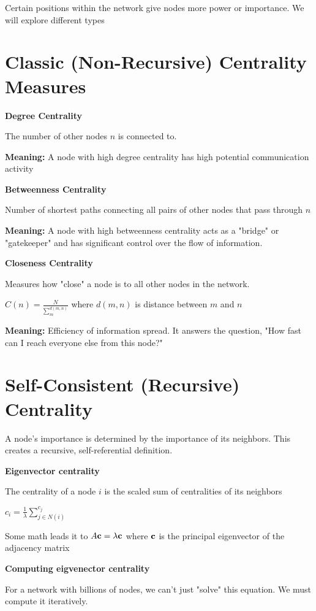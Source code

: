 Certain positions within the network give nodes more power or importance.
We will explore different types

\section*{Classic (Non-Recursive) Centrality Measures}

\textbf{Degree Centrality}

The number of other nodes $n$ is connected to. 

\textbf{Meaning:} A node with high degree centrality 
has high potential communication activity

\textbf{Betweenness Centrality}

Number of shortest paths connecting all pairs of other nodes that pass through $n$

\textbf{Meaning:} A node with high betweenness centrality acts as a "bridge" or "gatekeeper"
and has significant control over the flow of information.

\textbf{Closeness Centrality}

Measures how "close" a node is to all other nodes in the network.

$
C(n) = \frac{N}{\sum_{m}^{d(m, n)}}
$
where $d(m, n)$ is distance between $m$ and $n$

\textbf{Meaning:} Efficiency of information spread. It answers the question,
"How fast can I reach everyone else from this node?"

\section*{Self-Consistent (Recursive) Centrality}

A node's importance is determined by the importance of its neighbors. 
This creates a recursive, self-referential definition.

\textbf{Eigenvector centrality}

The centrality of a node $i$ is the scaled sum of centralities of its neighbors

$
c_i = \frac{1}{\lambda} \sum_{j \in N(i)}^{c_j}
$

Some math leads it to $A \mathbf{c} = \lambda \mathbf{c}$ where $\mathbf{c}$ is the principal 
eigenvector of the adjacency matrix

\textbf{Computing eigvenector centrality}

For a network with billions of nodes, we can't just "solve" this equation. We must compute it iteratively.


